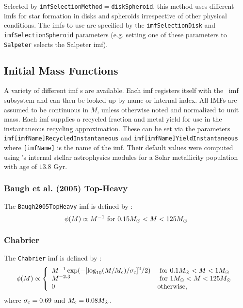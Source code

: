 Selected by {\tt imfSelectionMethod}$=${\tt diskSpheroid}, this method uses different {\gls{imf}}s for star formation in disks and spheroids irrespective of other physical conditions. The {\gls{imf}}s to use are specified by the {\tt imfSelectionDisk} and {\tt imfSelectionSpheroid} parameters (e.g. setting one of these parameters to {\tt Salpeter} selects the Salpeter \gls{imf}).

\subsection{Initial Mass Functions}\label{sec:physicsIMF}

A variety of different \gls{imf} s are available. Each \gls{imf} registers itself with the \glc\ \gls{imf} subsystem and can then be looked-up by name or internal index. All IMFs are assumed to be continuous in $M$, unless otherwise noted and normalized to unit mass. Each \gls{imf} supplies a recycled fraction and metal yield for use in the instantaneous recycling approximation. These can be set via the parameters {\tt imf[imfName]RecycledInstantaneous} and {\tt imf[imfName]YieldInstantaneous} where {\tt [imfName]} is the name of the \gls{imf}. Their default values were computed using \glc 's internal stellar astrophysics modules for a Solar metallicity population with age of $13.8$ Gyr.

\subsubsection{Baugh et al. (2005) Top-Heavy}

The {\tt Baugh2005TopHeavy} \gls{imf} is defined by \citep{baugh_can_2005}:
\begin{equation}
 \phi(M) \propto 
 M^{-1} \hbox{ for } 0.15M_\odot < M < 125M_\odot
\end{equation}

\subsubsection{Chabrier}

The {\tt Chabrier} \gls{imf} is defined by \citep{chabrier_galactic_2001}:
\begin{equation}
 \phi(M) \propto \left\{ \begin{array}{ll}
 M^{-1} \exp(-[\log_{10}(M/M_{\rm c})/\sigma_{\rm c}]^2/2) & \hbox{ for } 0.1M_\odot < M < 1M_\odot \\
 M^{-2.3} & \hbox{ for } 1M_\odot < M < 125M_\odot \\
 0 & \hbox {otherwise,} \end{array} \right.
\end{equation}
where $\sigma_{\rm c}=0.69$ and $M_{\rm c}=0.08M_\odot$.

